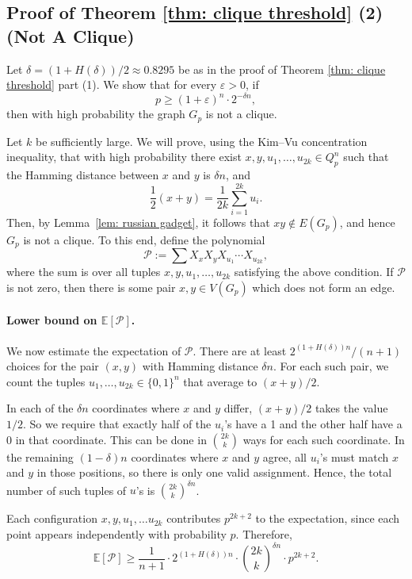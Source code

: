 \documentclass[11pt]{article}
\theoremstyle{definition}
\theoremstyle{plain}
\begin{document}
\subsection{Proof of Theorem \ref{thm: clique threshold} (2) (Not A Clique)}

Let \( \delta = (1 + H(\delta))/2 \approx 0.8295 \)  be as in the proof of Theorem \ref{thm: clique threshold} part (1). 
We show that for every \( \varepsilon > 0 \), if 
\[
p \geq  (1 + \varepsilon)^n \cdot 2^{-\delta n},
\]
then with high probability the graph \( G_p \) is not a clique.

Let \( k \) be sufficiently large. We will prove, using the Kim–Vu concentration inequality, that with high probability there exist \( x, y, u_1, \ldots, u_{2k} \in Q_p^n \) such that the Hamming distance between \( x \) and \( y \) is \( \delta n \), and
\[
\frac{1}{2}(x + y) = \frac{1}{2k} \sum_{i=1}^{2k} u_i.
\]
Then, by Lemma~\ref{lem: russian gadget}, it follows that \( xy \notin E(G_p) \), and hence \( G_p \) is not a clique.
To this end, define the polynomial
\[
\mathcal{P} := \sum X_x X_y X_{u_1} \cdots X_{u_{2k}},
\]
where the sum is over all tuples \( x, y, u_1, \ldots, u_{2k} \) satisfying the above condition. If $\mathcal{P}$ is not zero, then there is some pair $x,y \in V(G_p)$ which does not form an edge.


\paragraph{{\bf Lower bound on \( \mathbb{E}[\mathcal{P}] \).}}
We now estimate the expectation of \( \mathcal{P} \). There are at least \( 2^{(1+ H(\delta))n} /(n+1) \) choices for the pair \( (x, y) \) with Hamming distance \( \delta n \). For each such pair, we count the tuples \( u_1, \ldots, u_{2k} \in \{0,1\}^n \) that average to \((x + y)/2\).

In each of the \( \delta n \) coordinates where \( x \) and \( y \) differ,  \( (x+y)/2 \) takes the value $1/2$. So we require that exactly half of the \( u_i \)'s have a 1 and the other half have a 0 in that coordinate. This can be done in \( \binom{2k}{k} \) ways for each such coordinate. In the remaining \( (1 - \delta)n \) coordinates where \( x \) and \( y \) agree, all \( u_i \)'s must match \( x \) and \( y \) in those positions, so there is only one valid assignment. Hence, the total number of such tuples of $u$'s is  \( \binom{2k}{k}^{\delta n} \).

Each configuration $ x,y, u_1, \ldots u_{2k}$ contributes \( p^{2k+2} \) to the expectation, since each point appears independently with probability \( p \). Therefore,
\[
\mathbb{E}[\mathcal{P}] \geq  \frac{1}{n+1}\cdot 2^{(1 + H(\delta))n} \cdot \binom{2k}{k}^{\delta n} \cdot p^{2k+2}.
\]
\end{document}
